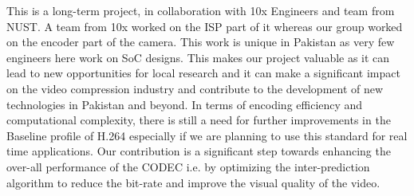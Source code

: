 This is a long-term project, in collaboration with 10x Engineers and team from NUST. A team from 10x worked on the ISP part of it whereas our group worked on the encoder part of the camera. This work is unique in Pakistan as very few engineers here work on SoC designs. This makes our project valuable as it can lead to new opportunities for local research and it can make a significant impact on the video compression industry and contribute to the development of new technologies in Pakistan and beyond.
In terms of encoding efficiency and computational complexity, there is still a need for further improvements in the Baseline profile of H.264 especially if we are planning to use this standard for real time applications. Our contribution is a significant step towards enhancing the over-all performance of the CODEC i.e. by optimizing the inter-prediction algorithm to reduce the bit-rate and improve the visual quality of the video. 


